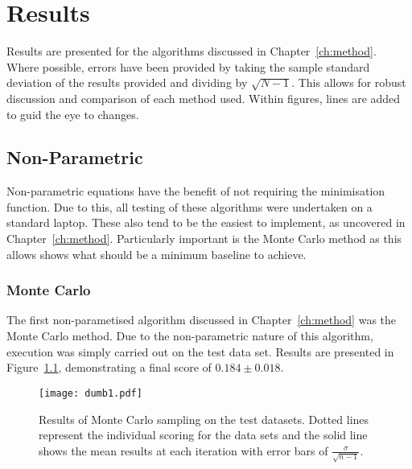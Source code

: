 \chapter{Results}










\graphicspath{{Chapter4/Figs/Vector/}{Chapter4/Figs/}}
Results are presented for the algorithms discussed in Chapter~\ref{ch:method}. Where possible, errors have been provided by taking the sample standard deviation of the results provided and dividing by $\sqrt{N-1}$. This allows for robust discussion and comparison of each method used. Within figures, lines are added to guid the eye to changes.

\section{Non-Parametric}
Non-parametric equations have the benefit of not requiring the minimisation function. Due to this, all testing of these algorithms were undertaken on a standard laptop. These also tend to be the easiest to implement, as uncovered in Chapter~\ref{ch:method}. Particularly important is the Monte Carlo method as this allows shows what should be a minimum baseline to achieve.

\subsection{Monte Carlo}
The first non-parametised algorithm discussed in Chapter~\ref{ch:method} was the Monte Carlo method. Due to the non-parametric nature of this algorithm, execution was simply carried out on the test data set. Results are presented in Figure~\ref{fig:MCTestSet}, demonstrating a final score of ${0.184\pm{}0.018}$.

\begin{figure}[H]
    \begin{center}
        \texttt{[image: dumb1.pdf]}
        \caption[Monte Carlo]{Results of Monte Carlo sampling on the test datasets. Dotted lines represent the individual scoring for the data sets and the solid line shows the mean results at each iteration with error bars of $\frac{\sigma{}}{\sqrt{n-1}}$.}
        \label{fig:MCTestSet}
    \end{center}
\end{figure}


